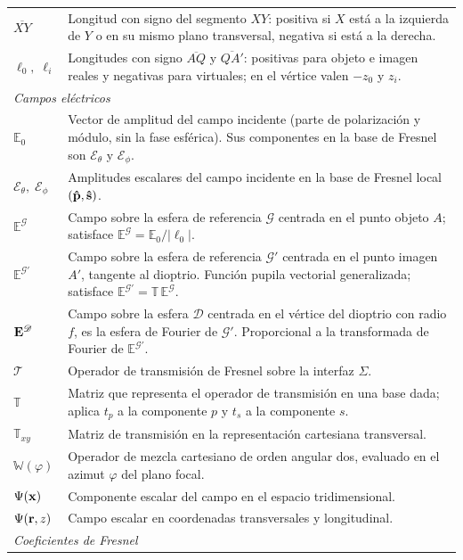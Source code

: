 \begin{longtable}{p{} p{}}
$\overline{XY}$ & Longitud con signo del segmento $XY$: positiva si $X$ está a la izquierda de $Y$ o en su mismo plano transversal, negativa si está a la derecha. \\
$\ell_0,\;\ell_i$ & Longitudes con signo $\overline{AQ}$ y $\overline{QA'}$: positivas para objeto e imagen reales y negativas para virtuales; en el vértice valen $-z_0$ y $z_i$. \\
\hline
\multicolumn{2}{l}{\textit{Campos eléctricos}} \\
\hline
$\mathbb E_0$ & Vector de amplitud del campo incidente (parte de polarización y módulo, sin la fase esférica). Sus componentes en la base de Fresnel son $\mathscr E_\theta$ y $\mathscr E_\phi$. \\
$\mathscr E_\theta,\;\mathscr E_\phi$ & Amplitudes escalares del campo incidente en la base de Fresnel local $(\bm{\hat{\mathbf{p}}}, \bm{\hat{\mathbf{s}}})$. \\
$\mathbb E^{\mathscr G}$ & Campo sobre la esfera de referencia $\mathscr G$ centrada en el punto objeto $A$; satisface $\mathbb E^{\mathscr G} = \mathbb E_0/|\ell_0|$. \\
\texorpdfstring{$\mathbb E^{\mathscr G'}$}{E\^{}G'} & Campo sobre la esfera de referencia $\mathscr G'$ centrada en el punto imagen $A'$, tangente al dioptrio. Función pupila vectorial generalizada; satisface $\mathbb E^{\mathscr G'} = \mathbb T\,\mathbb E^{\mathscr G}$. \\
$\vb E^{\mathscr D}$ & Campo sobre la esfera $\mathscr D$ centrada en el vértice del dioptrio con radio $f$, es la esfera de Fourier de $\mathscr G'$. Proporcional a la transformada de Fourier de $\mathbb E^{\mathscr G'}$. \\
$\mathscr T$ & Operador de transmisión de Fresnel sobre la interfaz $\Sigma$. \\
$\mathbb T$ & Matriz que representa el operador de transmisión en una base dada; aplica $t_p$ a la componente $p$ y $t_s$ a la componente $s$. \\
$\mathbb T_{xy}$ & Matriz de transmisión en la representación cartesiana transversal. \\
$\mathbb W(\varphi)$ & Operador de mezcla cartesiano de orden angular dos, evaluado en el azimut $\varphi$ del plano focal. \\
$\Psi(\vb x)$ & Componente escalar del campo en el espacio tridimensional. \\
$\Psi(\vb r,z)$ & Campo escalar en coordenadas transversales y longitudinal. \\
\hline
\multicolumn{2}{l}{\textit{Coeficientes de Fresnel}} \\

\end{longtable}
